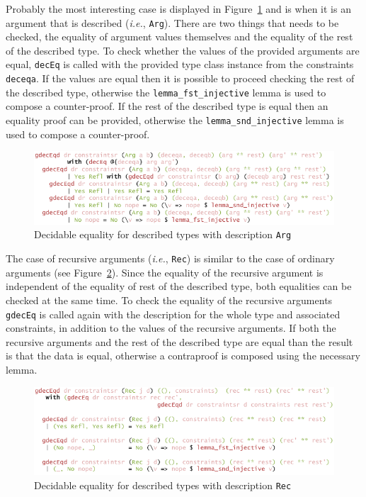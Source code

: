 \documentclass{ituthesis}
\newcommand{\ttconstructor}[1]{\textcolor{constructor-color}{\texttt{#1}}}
\newcommand{\ttdec}[1]{\textcolor{declared-var-color}{\texttt{#1}}}
\newcommand{\ttvar}[1]{\textcolor{local-var-color}{\texttt{#1}}}
\theoremstyle{break}
\begin{document}
Probably the most interesting case is displayed in Figure~\ref{fig:deceqgendesc2} and is when it is an argument that is described (\textit{i.e.}, \ttconstructor{Arg}).
There are two things that needs to be checked, the equality of argument values themselves and the equality of the rest of the described type.
To check whether the values of the provided arguments are equal, \ttdec{decEq} is called with the provided type class instance from the constraints \ttvar{deceqa}.
If the values are equal then it is possible to proceed checking the rest of the described type, otherwise the \ttdec{lemma\_fst\_injective} lemma is used to compose a counter-proof.
If the rest of the described type is equal then an equality proof can be provided, otherwise the \ttdec{lemma\_snd\_injective} lemma is used to compose a counter-proof.

\begin{figure}[ht]
\begin{center}
    \includegraphics[scale=0.5]{Figures/GenericDecEqDesc2.png}
\end{center}
\caption{Decidable equality for described types with description \ttconstructor{Arg}}
\label{fig:deceqgendesc2}
\end{figure}

The case of recursive arguments (\textit{i.e.}, \ttconstructor{Rec}) is similar to the case of ordinary arguments (see Figure~\ref{fig:deceqgendesc3}).
Since the equality of the recursive argument is independent of the equality of rest of the described type, both equalities can be checked at the same time.
To check the equality of the recursive arguments \ttdec{gdecEq} is called again with the description for the whole type and associated constraints, in addition to the values
of the recursive arguments.
If both the recursive arguments and the rest of the described type are equal than the result is that the data is equal,
otherwise a contraproof is composed using the necessary lemma.

\begin{figure}[ht]
\begin{center}
    \includegraphics[scale=0.5]{Figures/GenericDecEqDesc3.png}
\end{center}
\caption{Decidable equality for described types with description \ttconstructor{Rec}}
\label{fig:deceqgendesc3}
\end{figure}
\end{document}
